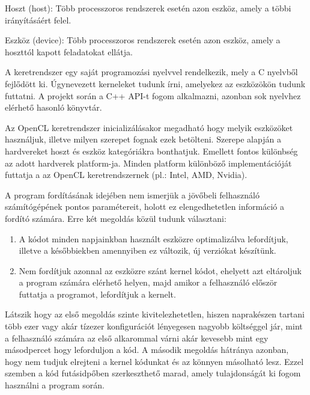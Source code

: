 \begin{definition}
Hoszt (host): Több processzoros rendszerek esetén azon eszköz, amely a többi irányításáért felel.
\end{definition}

\begin{definition}
Eszköz (device): Több processzoros rendszerek esetén azon eszköz, amely a hoszttól kapott feladatokat ellátja.
\end{definition}


A keretrendszer egy saját programozási nyelvvel rendelkezik, mely a C nyelvből fejlődött ki. Úgynevezett kerneleket tudunk írni, amelyekez az eszközökön tudunk futtatni. A projekt során a C++ API-t fogom alkalmazni, azonban sok nyelvhez elérhető hasonló könyvtár.

Az OpenCL keretrendszer inicializálásakor megadható hogy melyik eszközöket használjuk, illetve milyen szerepet fognak ezek betölteni. Szerepe alapján a hardvereket hoszt és eszköz kategóriákra bonthatjuk. Emellett fontos különbség az adott hardverek platform-ja. Minden platform különböző implementációját futtatja a az OpenCL keretrendszernek (pl.: Intel, AMD, Nvidia).

A program fordításának idejében nem ismerjük a jövőbeli felhasználó számítógépének pontos paramétereit, holott ez elengedhetetlen információ a fordító számára. Erre két megoldás közül tudunk választani:


\begin{enumerate}
  \item A kódot minden napjainkban használt eszközre optimalizálva lefordítjuk, illetve a későbbiekben amennyiben ez változik, új verziókat készítünk.
  \item Nem fordítjuk azonnal az eszközre szánt kernel kódot, ehelyett azt eltároljuk a program számára elérhető helyen, majd amikor a felhasználó először futtatja a programot, lefordítjuk a kernelt.
\end{enumerate}


Látszik hogy az első megoldás szinte kivitelezhetetlen, hiszen naprakészen tartani több ezer vagy akár tízezer konfigurációt lényegesen nagyobb költséggel jár, mint a felhasználó számára az első alkarommal várni akár kevesebb mint egy másodpercet hogy leforduljon a kód. A második megoldás hátránya azonban, hogy nem tudjuk elrejteni a kernel kódunkat és az könnyen másolható lesz. Ezzel szemben a kód futásidpőben szerkeszthető marad, amely tulajdonságát ki fogom használni a program során.


